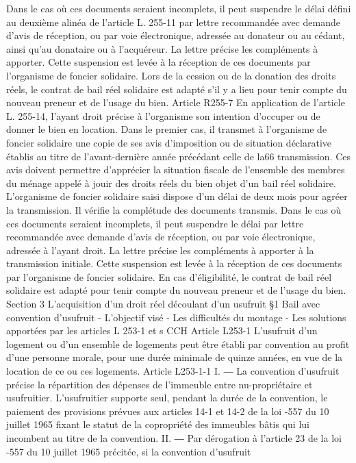 \documentclass[11pt,a4paper]{report}
\begin{document}
Dans le cas où ces documents seraient incomplets, il peut suspendre le délai défini au deuxième alinéa de
l'article L. 255-11 par lettre recommandée avec demande d'avis de réception, ou par voie électronique, adressée
au donateur ou au cédant, ainsi qu'au donataire ou à l'acquéreur. La lettre précise les compléments à apporter.
Cette suspension est levée à la réception de ces documents par l'organisme de foncier solidaire.
Lors de la cession ou de la donation des droits réels, le contrat de bail réel solidaire est adapté s'il y a lieu pour
tenir compte du nouveau preneur et de l'usage du bien.
Article R255-7
En application de l'article L. 255-14, l'ayant droit précise à l'organisme son intention d'occuper ou de donner le
bien en location. Dans le premier cas, il transmet à l'organisme de foncier solidaire une copie de ses avis
d'imposition ou de situation déclarative établis au titre de l'avant-dernière année précédant celle de la66
transmission. Ces avis doivent permettre d'apprécier la situation fiscale de l'ensemble des membres du ménage
appelé à jouir des droits réels du bien objet d'un bail réel solidaire.
L'organisme de foncier solidaire saisi dispose d'un délai de deux mois pour agréer la transmission. Il vérifie la
complétude des documents transmis. Dans le cas où ces documents seraient incomplets, il peut suspendre le
délai par lettre recommandée avec demande d'avis de réception, ou par voie électronique, adressée à l'ayant
droit. La lettre précise les compléments à apporter à la transmission initiale. Cette suspension est levée à la
réception de ces documents par l'organisme de foncier solidaire.
En cas d'éligibilité, le contrat de bail réel solidaire est adapté pour tenir compte du nouveau preneur et de
l'usage du bien.
Section 3 L’acquisition d’un droit réel découlant d’un usufruit
§1 Bail avec convention d’usufruit
- L’objectif visé
- Les difficultés du montage
- Les solutions apportées par les articles L 253-1 et s CCH
Article L253-1
L'usufruit d'un logement ou d'un ensemble de logements peut être établi par convention au profit d'une personne
morale, pour une durée minimale de quinze années, en vue de la location de ce ou ces logements.
Article L253-1-1
I. ― La convention d'usufruit précise la répartition des dépenses de l'immeuble entre nu-propriétaire et
usufruitier. L'usufruitier supporte seul, pendant la durée de la convention, le paiement des provisions prévues
aux articles 14-1 et 14-2 de la loi -557 du 10 juillet 1965 fixant le statut de la copropriété des immeubles
bâtis qui lui incombent au titre de la convention.
II. ― Par dérogation à l'article 23 de la loi -557 du 10 juillet 1965 précitée, si la convention d'usufruit
\end{document}
